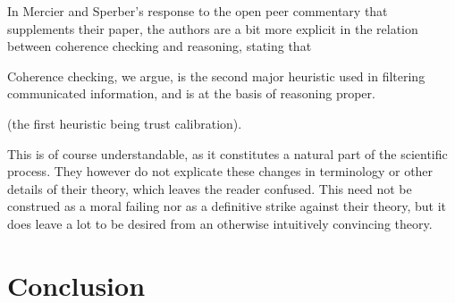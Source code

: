 In Mercier and Sperber's response to the open peer commentary that supplements their paper, the authors are a bit more explicit in the relation between coherence checking and reasoning, stating that
\begin{quoting}
    Coherence checking, we argue, is the second major heuristic used in filtering communicated information, and is at the basis of reasoning proper.
    \hfill \citep[p.~96]{MS11}
\end{quoting}
(the first heuristic being trust calibration).

This is of course understandable, as it constitutes a natural part of the scientific process. They however do not explicate these changes in terminology or other details of their theory, which leaves the reader confused.
This need not be construed as a moral failing nor as a definitive strike against their theory, but it does leave a lot to be desired from an otherwise intuitively convincing theory.

\section{Conclusion}

